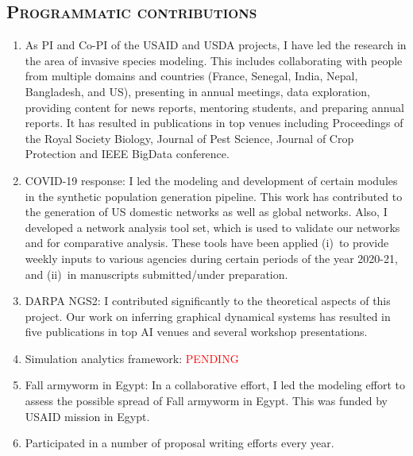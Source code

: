 \documentclass[margin,10pt]{res} %
\begin{document}
\begin{resume}
{\section{\textnormal{\textsc{Programmatic contributions}}}
\begin{enumerate}[$\circ$]
\item As PI and Co-PI of the USAID and USDA projects, I have led the
research in the area of invasive species modeling. This includes
collaborating with people from multiple domains and countries (France,
Senegal, India, Nepal, Bangladesh, and US), presenting in annual meetings,
data exploration, providing content for news reports, mentoring students,
and preparing annual reports. It has resulted in publications in top venues
including Proceedings of the Royal Society Biology, Journal of Pest
Science, Journal of Crop Protection and IEEE BigData conference.
\item COVID-19 response: I led the modeling and development of certain
modules in the synthetic population generation pipeline. This work has
contributed to the generation of US domestic networks as well as global
networks. Also, I developed a network analysis tool set, which is used to
validate our networks and for comparative analysis. These tools have been
applied (i)~to provide weekly inputs to various agencies during certain
periods of the year 2020-21, and (ii)~in manuscripts submitted/under
preparation.
\item DARPA NGS2: I contributed significantly to the theoretical aspects of
this project. Our work on inferring graphical dynamical systems has
resulted in five publications in top AI venues and several workshop
presentations.
\item Simulation analytics framework: \textcolor{red}{PENDING}
\item Fall armyworm in Egypt: In a collaborative effort, I led the modeling
effort to assess the possible spread of Fall armyworm in Egypt. This was
funded by USAID mission in Egypt.
\item Participated in a number of proposal writing efforts every year.
\end{enumerate}

}
\end{resume}
\end{document}
